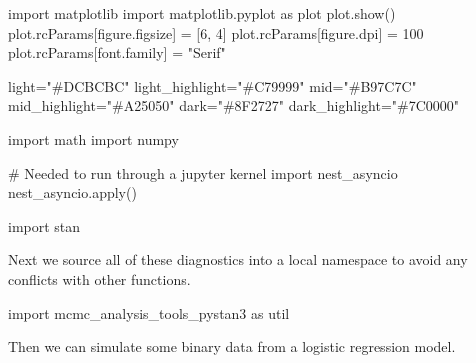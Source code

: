 \documentclass[
  letterpaper,
  DIV=11,
  numbers=noendperiod]{scrartcl}
\newenvironment{Shaded}{\begin{snugshade}}{\end{snugshade}}
\newcommand{\BuiltInTok}[1]{\textcolor[rgb]{0.00,0.23,0.31}{#1}}
\newcommand{\CommentTok}[1]{\textcolor[rgb]{0.37,0.37,0.37}{#1}}
\newcommand{\DecValTok}[1]{\textcolor[rgb]{0.68,0.00,0.00}{#1}}
\newcommand{\ImportTok}[1]{\textcolor[rgb]{0.00,0.46,0.62}{#1}}
\newcommand{\NormalTok}[1]{\textcolor[rgb]{0.00,0.23,0.31}{#1}}
\newcommand{\OperatorTok}[1]{\textcolor[rgb]{0.37,0.37,0.37}{#1}}
\newcommand{\StringTok}[1]{\textcolor[rgb]{0.13,0.47,0.30}{#1}}
\begin{document}
\begin{Shaded}
\begin{Highlighting}[]
\ImportTok{import}\NormalTok{ matplotlib}
\ImportTok{import}\NormalTok{ matplotlib.pyplot }\ImportTok{as}\NormalTok{ plot}
\NormalTok{plot.show()}
\NormalTok{plot.rcParams[}\StringTok{\textquotesingle{}figure.figsize\textquotesingle{}}\NormalTok{] }\OperatorTok{=}\NormalTok{ [}\DecValTok{6}\NormalTok{, }\DecValTok{4}\NormalTok{]}
\NormalTok{plot.rcParams[}\StringTok{\textquotesingle{}figure.dpi\textquotesingle{}}\NormalTok{] }\OperatorTok{=} \DecValTok{100}
\NormalTok{plot.rcParams[}\StringTok{\textquotesingle{}font.family\textquotesingle{}}\NormalTok{] }\OperatorTok{=} \StringTok{"Serif"}

\NormalTok{light}\OperatorTok{=}\StringTok{"\#DCBCBC"}
\NormalTok{light\_highlight}\OperatorTok{=}\StringTok{"\#C79999"}
\NormalTok{mid}\OperatorTok{=}\StringTok{"\#B97C7C"}
\NormalTok{mid\_highlight}\OperatorTok{=}\StringTok{"\#A25050"}
\NormalTok{dark}\OperatorTok{=}\StringTok{"\#8F2727"}
\NormalTok{dark\_highlight}\OperatorTok{=}\StringTok{"\#7C0000"}

\ImportTok{import}\NormalTok{ math}
\ImportTok{import}\NormalTok{ numpy}

\CommentTok{\# Needed to run through a jupyter kernel}
\ImportTok{import}\NormalTok{ nest\_asyncio}
\NormalTok{nest\_asyncio.}\BuiltInTok{apply}\NormalTok{()}

\ImportTok{import}\NormalTok{ stan}
\end{Highlighting}
\end{Shaded}

Next we source all of these diagnostics into a local namespace to avoid
any conflicts with other functions.

\begin{Shaded}
\begin{Highlighting}[]
\ImportTok{import}\NormalTok{ mcmc\_analysis\_tools\_pystan3 }\ImportTok{as}\NormalTok{ util}
\end{Highlighting}
\end{Shaded}

Then we can simulate some binary data from a logistic regression model.
\end{document}

